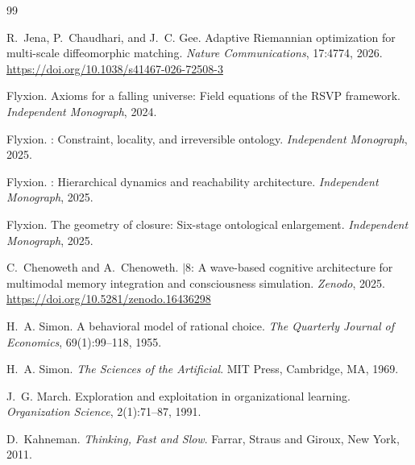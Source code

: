 \documentclass[12pt, a4paper]{article}
\theoremstyle{essaystyle}
\begin{document}
\newpage
{}
{}
\begin{thebibliography}{99}

R.~Jena, P.~Chaudhari, and J.~C. Gee.
\newblock Adaptive {R}iemannian optimization for multi-scale diffeomorphic matching.
\newblock \textit{Nature Communications}, 17:4774, 2026.
\newblock \url{https://doi.org/10.1038/s41467-026-72508-3}

Flyxion.
\newblock Axioms for a falling universe: {F}ield equations of the {RSVP} framework.
\newblock \textit{Independent Monograph}, 2024.

Flyxion.
: Constraint, locality, and irreversible ontology.
\newblock \textit{Independent Monograph}, 2025.

Flyxion.
: Hierarchical dynamics and reachability architecture.
\newblock \textit{Independent Monograph}, 2025.

Flyxion.
\newblock The geometry of closure: {S}ix-stage ontological enlargement.
\newblock \textit{Independent Monograph}, 2025.

C.~Chenoweth and A.~Chenoweth.
$|$8: A wave-based cognitive architecture for multimodal memory
  integration and consciousness simulation.
\newblock \textit{Zenodo}, 2025.
\newblock \url{https://doi.org/10.5281/zenodo.16436298}

H.~A. Simon.
\newblock A behavioral model of rational choice.
\newblock \textit{The Quarterly Journal of Economics}, 69(1):99--118, 1955.

H.~A. Simon.
\newblock \textit{The Sciences of the Artificial}.
\newblock MIT Press, Cambridge, MA, 1969.

J.~G. March.
\newblock Exploration and exploitation in organizational learning.
\newblock \textit{Organization Science}, 2(1):71--87, 1991.

D.~Kahneman.
\newblock \textit{Thinking, Fast and Slow}.
\newblock Farrar, Straus and Giroux, New York, 2011.


\end{thebibliography}
\end{document}
